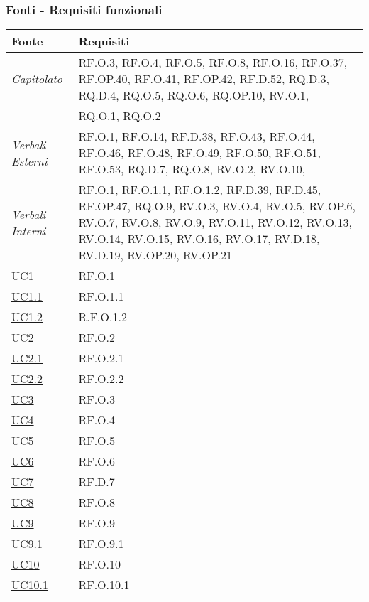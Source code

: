 \subsubsection{Fonti - Requisiti funzionali}

\begin{longtable}{|P{4,5cm}|>{\arraybackslash}P{9cm}|}
  \hline
  \textbf{Fonte} & \textbf{Requisiti} \\
  \hline
  \emph{Capitolato} & RF.O.3, RF.O.4, RF.O.5, RF.O.8, RF.O.16, RF.O.37, RF.OP.40, RF.O.41, RF.OP.42, RF.D.52, RQ.D.3, RQ.D.4, RQ.O.5, RQ.O.6, RQ.OP.10, RV.O.1,  \\
  \hline
  \NdP{} & RQ.O.1, RQ.O.2 \\
  \hline
  \emph{Verbali Esterni} & RF.O.1, RF.O.14, RF.D.38, RF.O.43, RF.O.44, RF.O.46, RF.O.48, RF.O.49, RF.O.50, RF.O.51, RF.O.53, RQ.D.7, RQ.O.8, RV.O.2, RV.O.10, \\
  \hline
  \emph{Verbali Interni} & RF.O.1, RF.O.1.1, RF.O.1.2, RF.D.39, RF.D.45, RF.OP.47, RQ.O.9, RV.O.3, RV.O.4, RV.O.5, RV.OP.6, RV.O.7, RV.O.8, RV.O.9, RV.O.11, RV.O.12, RV.O.13, RV.O.14, RV.O.15, RV.O.16, RV.O.17, RV.D.18, RV.D.19, RV.OP.20, RV.OP.21 \\
  \hline
  \hyperref[UC1]{UC1} & RF.O.1 \\
  \hline
  \hyperref[UC1point1]{UC1.1} & RF.O.1.1 \\
  \hline
  \hyperref[UC1]{UC1.2} & R.F.O.1.2 \\
  \hline
  \hyperref[UC2]{UC2} & RF.O.2 \\
  \hline
  \hyperref[UC2point1]{UC2.1} & RF.O.2.1 \\
  \hline
  \hyperref[UC2point2]{UC2.2} & RF.O.2.2 \\
  \hline
  \hyperref[UC3]{UC3} & RF.O.3 \\
  \hline
  \hyperref[UC4]{UC4} & RF.O.4 \\
  \hline
  \hyperref[UC5]{UC5} & RF.O.5 \\
  \hline
  \hyperref[UC6]{UC6} & RF.O.6 \\
  \hline
  \hyperref[UC7]{UC7} & RF.D.7 \\
  \hline
  \hyperref[UC8]{UC8} & RF.O.8 \\
  \hline
  \hyperref[UC9]{UC9} & RF.O.9 \\
  \hline
  \hyperref[UC9point1]{UC9.1} & RF.O.9.1 \\
  \hline
  \hyperref[UC10]{UC10} & RF.O.10 \\
  \hline
  \hyperref[UC10point1]{UC10.1} & RF.O.10.1 \\ 

\end{longtable}
